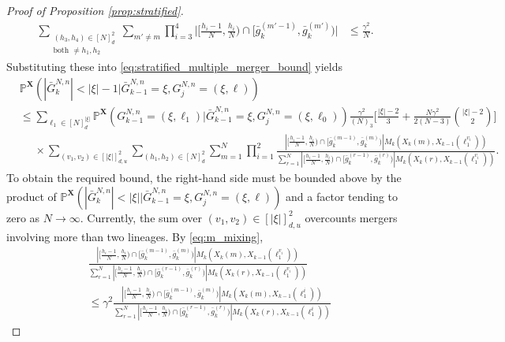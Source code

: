 \documentclass[a4paper,11pt]{article}
\theoremstyle{definition}
\newcommand{\bbP}{\mathbb{P}}
\newcommand{\bfX}{\mathbf{X}}
\begin{document}
\begin{proof}[Proof of Proposition \ref{prop:stratified}]
\begin{align*}
\sum_{ \substack{ ( h_3, h_4 ) \in [ N ]_d^2 \\ \text{both } \neq h_1, h_2 } } \sum_{ m' \neq m } \prod_{ i = 3 }^4 \Big| \Big[ \frac{ h_i - 1 }{ N }, \frac{ h_i }{ N } \Big) \cap [ \bar{ g }_k^{ ( m' - 1 ) }, \bar{ g }_k^{ ( m' ) } ) \Big| &\leq \frac{ \gamma^2 }{ N }.
\end{align*}
Substituting these into \eqref{eq:stratified_multiple_merger_bound} yields
\begin{align*}
&\bbP^{ \bfX }( | \bar{ G }_k^{ N, n } | < | \xi | - 1 | \bar{ G }_{ k - 1 }^{ N, n } = \xi, G_j^{ N, n } = ( \xi, \ell ) ) \\
&\leq \sum_{ \ell_1 \in [ N ]_d^{ | \xi | } } \bbP^{ \bfX }( G_{ k - 1 }^{ N, n } = ( \xi, \ell_1 ) | \bar{ G }_{ k - 1 }^{ N, n } = \xi, G_j^{ N, n } = ( \xi, \ell_0 ) ) \frac{ \gamma^2 }{ ( N )_3 } \Bigg[ \frac{ | \xi | - 2 }{ 3 } + \frac{ N \gamma^2 }{ 2 ( N - 3 ) } \binom{ | \xi | - 2 }{ 2 } \Bigg]\\
&\phantom{\leq} \times  \sum_{ ( v_1, v_2 ) \in [ | \xi | ]_{ d, u }^2 } \sum_{ ( h_1, h_2 ) \in [ N ]_d^2 } \sum_{ m = 1 }^N  \prod_{ i = 1 }^2 \frac{ | [ \frac{ h_i - 1 }{ N }, \frac{ h_i }{ N } ) \cap [ \bar{ g }_k^{ ( m - 1 ) }, \bar{ g }_k^{ ( m ) } ) | M_k( X_k( m ), X_{ k - 1 }( \ell_1^{ v_i } ) ) }{ \sum_{ r = 1 }^N | [ \frac{ h_i - 1 }{ N }, \frac{ h_i }{ N } ) \cap [ \bar{ g }_k^{ ( r - 1 ) }, \bar{ g }_k^{ ( r ) } ) | M_k( X_k( r ), X_{ k - 1 }( \ell_1^{ v_i } ) ) }.
\end{align*}
To obtain the required bound, the right-hand side must be bounded above by the product of $\bbP^{ \bfX }( | \bar{ G }_k^{ N, n } | < | \xi | | \bar{ G }_{ k - 1 }^{ N, n } = \xi, G_j^{ N, n } = ( \xi, \ell ) )$ and a factor tending to zero as $N \to \infty$.
Currently, the sum over $( v_1, v_2 ) \in [ | \xi | ]_{ d, u }^2$ overcounts mergers involving more than two lineages.
By \eqref{eq:m_mixing}, 
\begin{align*}
&\frac{ | [ \frac{ h_i - 1 }{ N }, \frac{ h_i }{ N } ) \cap [ \bar{ g }_k^{ ( m - 1 ) }, \bar{ g }_k^{ ( m ) } ) | M_k( X_k( m ), X_{ k - 1 }( \ell_1^{ v_i } ) ) }{ \sum_{ r = 1 }^N | [ \frac{ h_i - 1 }{ N }, \frac{ h_i }{ N } ) \cap [ \bar{ g }_k^{ ( r - 1 ) }, \bar{ g }_k^{ ( r ) } ) | M_k( X_k( r ), X_{ k - 1 }( \ell_1^{ v_i } ) ) } \\
&\leq \gamma^2 \frac{ | [ \frac{ h_i - 1 }{ N }, \frac{ h_i }{ N } ) \cap [ \bar{ g }_k^{ ( m - 1 ) }, \bar{ g }_k^{ ( m ) } ) | M_k( X_k( m ), X_{ k - 1 }( \ell_1^i ) ) }{ \sum_{ r = 1 }^N | [ \frac{ h_i - 1 }{ N }, \frac{ h_i }{ N } ) \cap [ \bar{ g }_k^{ ( r - 1 ) }, \bar{ g }_k^{ ( r ) } ) | M_k( X_k( r ), X_{ k - 1 }( \ell_1^i ) ) }

\end{align*}
\end{proof}
\end{document}
